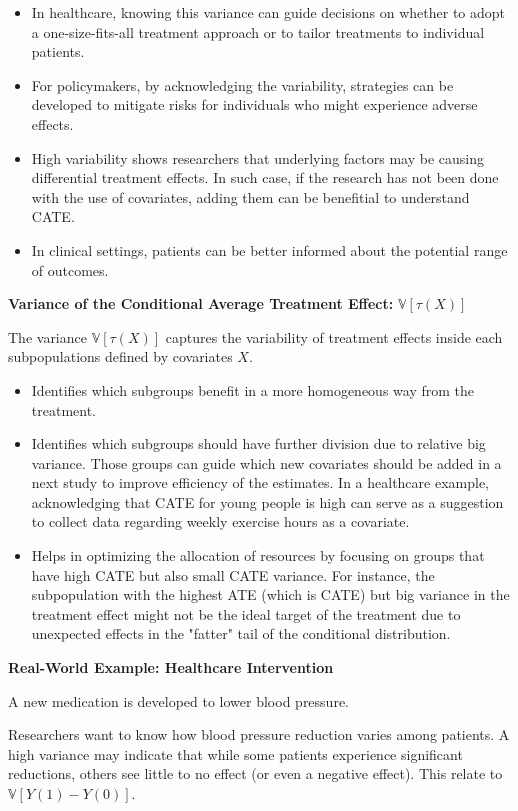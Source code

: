 \documentclass{article}
\begin{document}
\begin{itemize}
  \item In healthcare, knowing this variance can guide decisions on whether to adopt a one-size-fits-all treatment approach or to tailor treatments to individual patients.
  \item For policymakers, by acknowledging the variability, strategies can be developed to mitigate risks for individuals who might experience adverse effects.
  \item High variability shows researchers that underlying factors may be causing differential treatment effects. In such case, if the research has not been done with the use of covariates, adding them can be benefitial to understand CATE.
  \item In clinical settings, patients can be better informed about the potential range of outcomes.
\end{itemize}

\textbf{Variance of the Conditional Average Treatment Effect:} \(\mathbb{V}[\tau(X)]\)

The variance \(\mathbb{V}[\tau(X)]\) captures the variability of treatment effects inside each subpopulations defined by covariates \(X\).

\begin{itemize}
  \item Identifies which subgroups benefit in a more homogeneous way from the treatment.
  \item Identifies which subgroups should have further division due to relative big variance. Those groups can guide which new covariates should be added in a next study to improve efficiency of the estimates. In a healthcare example, acknowledging that CATE for young people is high can serve as a suggestion to collect data regarding weekly exercise hours as a covariate.
  \item Helps in optimizing the allocation of resources by focusing on groups that have high CATE but also small CATE variance. For instance, the subpopulation with the highest ATE (which is CATE) but big variance in the treatment effect might not be the ideal target of the treatment due to unexpected effects in the "fatter" tail of the conditional distribution.
\end{itemize}

\textbf{Real-World Example: Healthcare Intervention}

A new medication is developed to lower blood pressure.

Researchers want to know how blood pressure reduction varies among patients. A high variance may indicate that while some patients experience significant reductions, others see little to no effect (or even a negative effect). This relate to \(\mathbb{V}[Y(1) - Y(0)]\).
\end{document}
